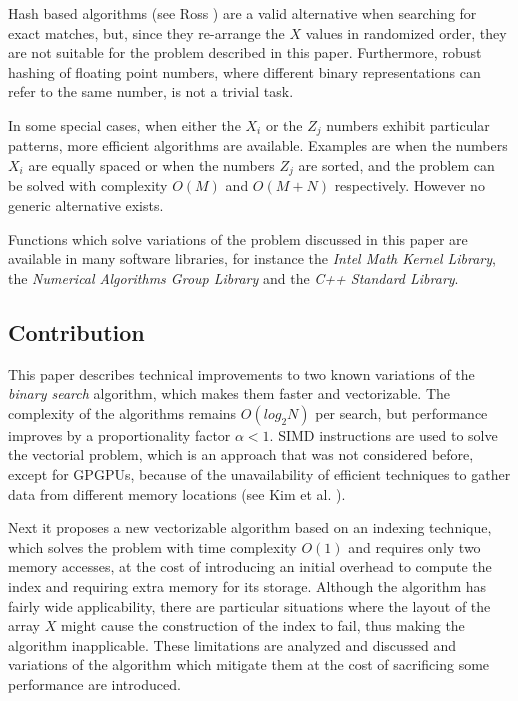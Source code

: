 \documentclass[preprint,1p,times]{elsarticle}
\begin{document}
Hash based algorithms (see Ross \cite{Ross2007}) are a valid alternative when searching for exact matches, but, since they re-arrange the $X$ values in randomized order, they are not suitable for the problem described in this paper. Furthermore, robust hashing of floating point numbers, where different binary representations can refer to the same number, is not a trivial task.

In some special cases, when either the $X_i$ or the $Z_j$ numbers exhibit particular patterns, more efficient algorithms are available. 
Examples are when the numbers $X_i$ are equally spaced or when the numbers $Z_j$ are sorted, 
and the problem can be solved with complexity $O(M)$ and $O(M+N)$ respectively. However no generic alternative exists.

Functions which solve variations of the problem discussed in this paper are available in many software libraries, for instance the \textit{Intel Math Kernel Library}, the \textit{Numerical Algorithms Group Library} and the \textit{C++ Standard Library}.


\subsection{Contribution}
This paper describes technical improvements to two known variations of the \textit{binary search} algorithm, which makes them faster and vectorizable. The complexity of the algorithms remains $O\left(log_2N\right)$ per search, but performance improves by a proportionality factor $\alpha<1$. SIMD instructions are used to solve the vectorial problem, which is an approach that was not considered before, except for GPGPUs, because of the unavailability of efficient techniques to gather data from different memory locations (see Kim et al. \cite{Kim2011}).

Next it proposes a new vectorizable algorithm based on an indexing technique, which solves the problem with time complexity $O(1)$ and requires only two memory accesses, at the cost of introducing an initial overhead to compute the index and requiring extra memory for its storage. Although the algorithm has fairly wide applicability, there are particular situations where the layout of the array $X$ might cause the construction of the index to fail, thus making the algorithm inapplicable. These limitations are analyzed and discussed and variations of the algorithm which mitigate them at the cost of sacrificing some performance are introduced.
\end{document}
